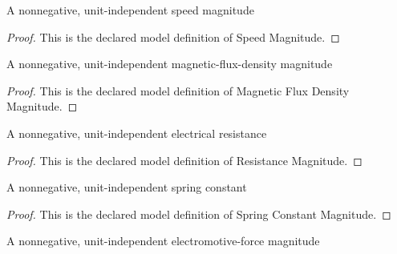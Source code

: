\begin{definition}
  \label{def:physics:phyx-mini-0979:phyxminiproblems-problemphyxmini0979-speedmagnitude}
  A nonnegative, unit-independent speed magnitude
\end{definition}
\begin{proof}
  This is the declared model definition of Speed Magnitude.
\end{proof}
\begin{definition}
  \label{def:physics:phyx-mini-0979:phyxminiproblems-problemphyxmini0979-magneticfluxdensitymagnitude}
  A nonnegative, unit-independent magnetic-flux-density magnitude
\end{definition}
\begin{proof}
  This is the declared model definition of Magnetic Flux Density Magnitude.
\end{proof}
\begin{definition}
  \label{def:physics:phyx-mini-0979:phyxminiproblems-problemphyxmini0979-resistancemagnitude}
  A nonnegative, unit-independent electrical resistance
\end{definition}
\begin{proof}
  This is the declared model definition of Resistance Magnitude.
\end{proof}
\begin{definition}
  \label{def:physics:phyx-mini-0979:phyxminiproblems-problemphyxmini0979-springconstantmagnitude}
  A nonnegative, unit-independent spring constant
\end{definition}
\begin{proof}
  This is the declared model definition of Spring Constant Magnitude.
\end{proof}
\begin{definition}
  \label{def:physics:phyx-mini-0979:phyxminiproblems-problemphyxmini0979-electromotiveforcemagnitude}
  A nonnegative, unit-independent electromotive-force magnitude
\end{definition}
